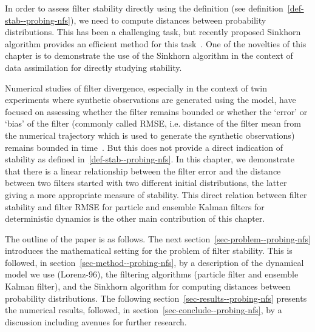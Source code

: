In order to assess filter stability directly using the definition
(see definition~\eqref{def-stab--probing-nfs}), we need to compute distances between
probability distributions. This has been a challenging task, but recently proposed Sinkhorn algorithm provides an efficient method for this task~\cite{genevay2019entropy, genevay2018learning, feydy2019interpolating, arjovsky2017wasserstein}. One of the novelties of this chapter is to demonstrate the use of the Sinkhorn algorithm in the context of data assimilation for directly studying stability.

Numerical studies of filter divergence, especially in the context of twin experiments where synthetic observations are generated using the model, have focused on assessing whether the filter remains bounded or whether the `error' or `bias' of the filter (commonly called RMSE, i.e. distance of the filter mean from the numerical trajectory which is used to generate the synthetic observations) remains bounded in time~\cite{KLS14, law2016filter}. But this does not provide a direct indication of stability as defined in~\eqref{def-stab--probing-nfs}. In this chapter, we demonstrate that there is a linear relationship between the filter error and the distance between two filters started with two different initial distributions, the latter giving a more appropriate measure of stability. This direct relation between filter stability and filter RMSE for particle and ensemble Kalman filters for deterministic dynamics is the other main contribution of this chapter.

The outline of the paper is as follows. The next section~\ref{sec-problem--probing-nfs} introduces the mathematical setting for the problem of filter stability. This is followed, in section~\ref{sec-method--probing-nfs}, by a description of the dynamical model we use (Lorenz-96), the filtering algorithms (particle filter and ensemble Kalman filter), and the Sinkhorn algorithm for computing distances between probability distributions. The following section~\ref{sec-results--probing-nfs} presents the numerical results, followed, in section~\ref{sec-conclude--probing-nfs}, by a discussion including avenues for further research.

